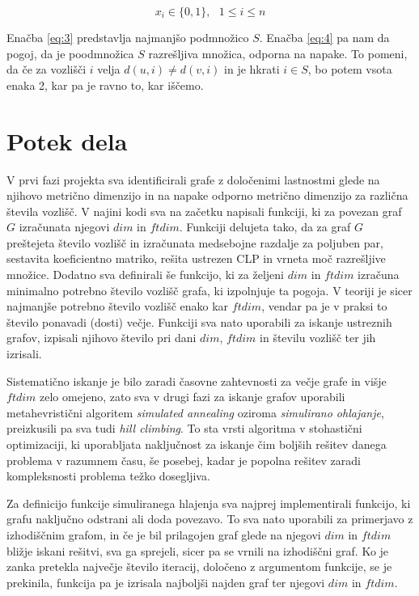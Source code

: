 \documentclass[12pt]{article}
\begin{document}
\begin{equation}
    x_i \in \{0, 1\}, \text{ } 1 \leq i \leq n
\label{eq:5}
\end{equation}

Enačba \eqref{eq:3} predstavlja najmanjšo podmnožico $S.$ Enačba \eqref{eq:4} pa nam da pogoj, da
je poodmnožica $S$ razrešljiva množica, odporna na napake. To pomeni, da če za vozlišči $i$ velja 
$d(u, i) \neq d(v, i)$ in je hkrati $i \in S$, bo potem vsota enaka 2, kar pa je ravno to, kar iščemo.

\section{Potek dela}

V prvi fazi projekta sva identificirali grafe z določenimi lastnostmi glede na njihovo metrično 
dimenzijo in na napake odporno metrično dimenzijo za različna števila vozlišč. V najini kodi sva 
na začetku napisali funkciji, ki za povezan graf $G$ izračunata njegovi $dim$ in $ftdim$. Funkciji 
delujeta tako, da za graf $G$ preštejeta število vozlišč in izračunata medsebojne razdalje za poljuben 
par, sestavita koeficientno matriko, rešita ustrezen CLP in vrneta moč razrešljive množice. Dodatno 
sva definirali še funkcijo, ki za željeni $dim$ in $ftdim$ izračuna minimalno potrebno število 
vozlišč grafa, ki izpolnjuje ta pogoja. V teoriji je sicer najmanjše potrebno število vozlišč enako 
kar $ftdim$, vendar pa je v praksi to število ponavadi (dosti) večje. Funkciji sva nato uporabili za 
iskanje ustreznih grafov, izpisali njihovo število pri dani $dim$, $ftdim$ in številu vozlišč ter jih 
izrisali.

Sistematično iskanje je bilo zaradi časovne zahtevnosti za večje grafe in višje $ftdim$ zelo omejeno, 
zato sva v drugi fazi za iskanje grafov uporabili metahevristični algoritem \textit{simulated annealing} 
oziroma \textit{simulirano ohlajanje}, preizkusili pa sva tudi \textit{hill climbing}. To sta vrsti 
algoritma v stohastični optimizaciji, ki uporabljata naključnost za iskanje čim boljših rešitev danega 
problema v razumnem času, še posebej, kadar je popolna rešitev zaradi kompleksnosti problema težko dosegljiva. 

Za definicijo funkcije simuliranega hlajenja sva najprej implementirali funkcijo, ki grafu naključno odstrani ali 
doda povezavo. To sva nato uporabili za primerjavo z izhodiščnim grafom, in če je bil prilagojen graf glede na 
njegovi $dim$ in $ftdim$ bližje iskani rešitvi, sva ga sprejeli, sicer pa se vrnili na izhodiščni graf. Ko je 
zanka pretekla največje število iteracij, določeno z argumentom funkcije, se je prekinila, funkcija pa je izrisala 
najboljši najden graf ter njegovi $dim$ in $ftdim$.
\end{document}
